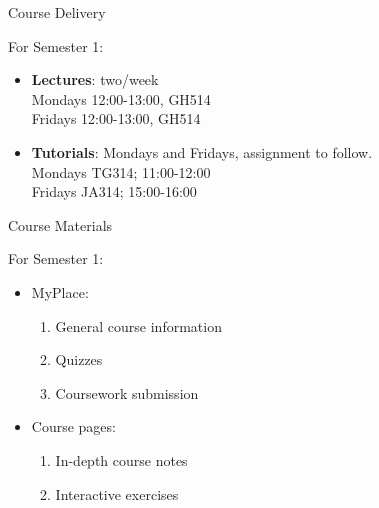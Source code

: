\documentclass[xetex,aspectratio=169,14pt,hyperref={pdfpagelabels=true,pdflang={en-GB}}]{beamer}
\begin{document}

\begin{frame}
  {Course Delivery}

  For Semester 1:
  \begin{itemize}
  \item \textbf{Lectures}: two/week \\
    \quad Mondays 12:00-13:00, GH514 \\
    \quad Fridays 12:00-13:00, GH514

    \medskip

  \item \textbf{Tutorials}: Mondays and Fridays, assignment to follow. \\
    \quad Mondays TG314; 11:00-12:00 \\
    \quad Fridays JA314; 15:00-16:00
  \end{itemize}
\end{frame}

\begin{frame}
  {Course Materials}

  For Semester 1:
  \begin{itemize}
  \item MyPlace:
    \begin{enumerate}
    \item General course information
    \item Quizzes
    \item Coursework submission
    \end{enumerate}
  \item Course pages: \\
    \begin{enumerate}
    \item In-depth course notes
    \item Interactive exercises
    \end{enumerate}
  \end{itemize}
\end{frame}
\end{document}
